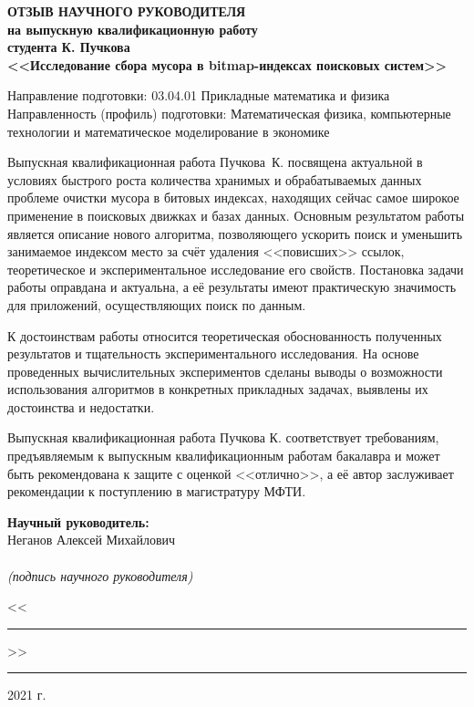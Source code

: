 \documentclass[a4paper,oneside,final,12pt,russian]{extarticle}
\begin{document}
\begin{center}
\textbf{ОТЗЫВ НАУЧНОГО РУКОВОДИТЕЛЯ}\\
\textbf{на выпускную квалификационную работу}\\
\textbf{студента К. Пучкова}\\
\textbf{<<Исследование сбора мусора в bitmap-индексах поисковых систем>>}\\
\end{center}

\onehalfspacing

\begin{flushleft}
Направление подготовки: 03.04.01 Прикладные математика и физика\\
Направленность (профиль) подготовки: Математическая физика,
компьютерные технологии и математическое моделирование в экономике\\
\end{flushleft}

Выпускная квалификационная работа Пучкова~К. посвящена актуальной в условиях
быстрого роста количества хранимых и обрабатываемых данных проблеме очистки мусора в битовых индексах,
находящих сейчас самое широкое применение в поисковых движках и базах данных.
Основным результатом работы является
описание нового алгоритма, позволяющего ускорить поиск и уменьшить занимаемое индексом место
за счёт удаления <<повисших>> ссылок, теоретическое и экспериментальное исследование его свойств. Постановка
задачи работы оправдана и актуальна, а её результаты имеют практическую значимость для приложений, осуществляющих
поиск по данным.

К достоинствам работы относится теоретическая обоснованность полученных результатов
и тщательность экспериментального исследования.
На основе проведенных вычислительных экспериментов сделаны выводы о возможности использования алгоритмов
в конкретных прикладных задачах, выявлены их достоинства и недостатки.

Выпускная квалификационная работа Пучкова К. соответствует требованиям, предъявляемым к
выпускным квалификационным работам бакалавра и может быть рекомендована к защите
с оценкой <<отлично>>, а её автор заслуживает рекомендации к поступлению в магистратуру МФТИ.

\singlespacing

\vspace{18mm}

\hspace{90mm}
\begin{minipage}{0.4\textwidth}
\begin{flushleft}
\textbf{Научный руководитель:}\\Неганов Алексей Михайлович\\
\vspace{4mm} \hrulefill \\
{\centering\scriptsize\textit{(подпись научного руководителя)}\\}
\end{flushleft}
\begin{flushright}
<<\rule{10mm}{0.4pt}>>\rule{30mm}{0.4pt} 2021 г.
\end{flushright}    
\end{minipage}

\thispagestyle{empty}
\end{document}
